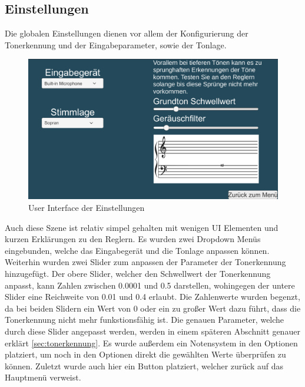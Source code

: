 \subsection*{Einstellungen}
Die globalen Einstellungen dienen vor allem der Konfigurierung der Tonerkennung und der Eingabeparameter, sowie der Tonlage. 
\begin{figure}[H]
    \centering
    \includegraphics[width=1\textwidth]{Bilder/optionen.png}
    \caption{User Interface der Einstellungen}
    \label{sec:hps_algo}
\end{figure}
Auch diese Szene ist relativ simpel gehalten mit wenigen UI Elementen und kurzen Erklärungen zu den Reglern. Es wurden zwei Dropdown Menüs eingebunden, welche das Eingabegerät und die Tonlage anpassen können. Weiterhin wurden zwei Slider zum anpassen der Parameter der Tonerkennung hinzugefügt. Der obere Slider, welcher den Schwellwert der Tonerkennung anpasst, kann Zahlen zwischen 0.0001 und 0.5 darstellen, wohingegen der untere Slider eine Reichweite von 0.01 und 0.4 erlaubt. Die Zahlenwerte wurden begenzt, da bei beiden Slidern ein Wert von 0 oder ein zu großer Wert dazu führt, dass die Tonerkennung nicht mehr funkstionsfähig ist. Die genauen Parameter, welche durch diese Slider angepasst werden, werden in einem späteren Abschnitt genauer erklärt \ref{sec:tonerkennung}. Es wurde außerdem ein Notensystem in den Optionen platziert, um noch in den Optionen direkt die gewählten Werte überprüfen zu können. Zuletzt wurde auch hier ein Button platziert, welcher zurück auf das Hauptmenü verweist. 

\newpage

